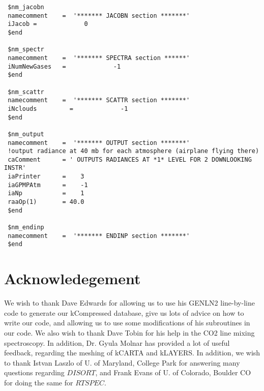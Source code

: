 \documentclass[11pt]{article}
\begin{document}
\begin{verbatim}
 $nm_jacobn
 namecomment    =  '******* JACOBN section *******'
 iJacob =             0
 $end

 $nm_spectr
 namecomment    =  '******* SPECTRA section ******'
 iNumNewGases   =             -1
 $end

 $nm_scattr
 namecomment    =  '******* SCATTR section *******'
 iNclouds         =             -1
 $end

 $nm_output
 namecomment    =  '******* OUTPUT section *******'
 !output radiance at 40 mb for each atmosphere (airplane flying there)
 caComment      = ' OUTPUTS RADIANCES AT *1* LEVEL FOR 2 DOWNLOOKING INSTR'
 iaPrinter      =    3
 iaGPMPAtm      =    -1
 iaNp           =    1
 raaOp(1)       = 40.0
 $end

 $nm_endinp
 namecomment    =  '******* ENDINP section *******'
 $end
\end{verbatim}

\section{Acknowledegement}
We wish to thank Dave Edwards for allowing us to use his {\sf GENLN2}
line-by-line code to generate our {\sf kCompressed} database, give us lots 
of advice on how to write our code, and allowing us to use some
modifications of his subroutines in our code. We also wish to thank Dave 
Tobin for his help in the CO2 line mixing spectroscopy. In addition, Dr. 
Gyula Molnar has provided a lot of useful feedback, regarding the meshing 
of kCARTA and kLAYERS. In addition, we wish to thank Istvan Laszlo of U. of 
Maryland, College Park for answering many questions regarding $DISORT$, and 
Frank Evans of U. of Colorado, Boulder CO for doing the same for $RTSPEC$.
\end{document}
